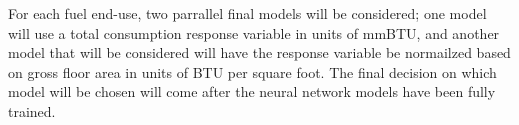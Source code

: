 For each fuel end-use, two parrallel final models will be considered; one model will use a total consumption response variable in units of mmBTU, and another model that will be considered will have the response variable be normailzed based on gross floor area in units of BTU per square foot.  The final decision on which model will be chosen will come after the neural network models have been fully trained.